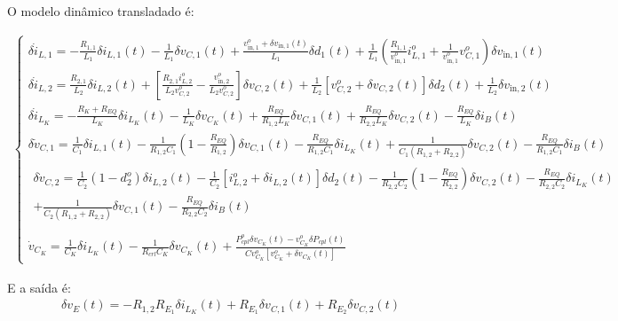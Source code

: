 O modelo dinâmico transladado é:

\begin{gather}
  \begin{cases}
    \delta \dot{i}_{L,1} = - \frac{R_{1,1}}{L_1} \delta i_{L,1}(t) - \frac{1}{L_1} \delta v_{C,1}(t) 
    + \frac{v_{\text{in}, 1}^o + \delta v_{\text{in}, 1}(t)}{L_1} \delta d_1(t) + 
    \frac{1}{L_1} \left(\frac{R_{1,1}}{v_{\text{in}, 1}^o} i_{L,1}^o + \frac{1}{v_{\text{in}, 1}^o} v_{C,1}^o\right) \delta v_{\text{in}, 1}(t) \\[12pt]
  \delta \dot{i}_{L,2} = \frac{R_{2,1}}{L_2} \delta i_{L,2}(t)
  + \left[\frac{R_{2,1} i_{L,2}^o}{L_2 v_{C,2}^o} - \frac{v_{\text{in},2}^o}{L_2 v_{C,2}^o}\right] \delta v_{C,2}(t) + \frac{1}{L_2} \left[v_{C,2}^o + \delta v_{C,2}(t)\right] \delta d_2(t) + \frac{1}{L_2} \delta v_{\text{in},2}(t) \\[12pt]
  \delta \dot{i}_{L_K} = - \frac{R_K + R_{EQ}}{L_K} \delta i_{L_K}(t)
  - \frac{1}{L_K} \delta v_{C_K}(t)
  + \frac{R_{EQ}}{{R_{1,2}}L_K} \delta v_{C,1}(t)
  + \frac{R_{EQ}}{R_{2,2}L_K} \delta v_{C,2}(t)
  - \frac{R_{EQ}}{L_K} \delta i_B(t) \\[12pt]
  \delta \dot v_{C,1} = \frac{1}{C_1} \delta i_{L,1}(t)
  - \frac{1}{R_{1,2}C_1} \left(1 - \frac{R_{EQ}}{{R_{1,2}}}\right) \delta v_{C,1}(t)
  - \frac{R_{EQ}}{R_{1,2} C_1} \delta i_{L_K}(t)
  + \frac{1}{C_1 (R_{1,2} + R_{2,2})} \delta v_{C,2}(t)
  - \frac{R_{EQ}}{R_{1,2} C_1} \delta i_B(t) \\[12pt]
  \begin{aligned}
    \delta \dot v_{C,2} = \frac{1}{C_2} (1 - d_2^o) \delta i_{L,2}(t) - \frac{1}{C_2} \left[i_{L,2}^o + \delta i_{L,2}(t)\right] \delta d_2(t)
    - \frac{1}{R_{2,2}C_2} \left(1 - \frac{R_{EQ}}{R_{2,2}}\right) \delta v_{C,2}(t)  
    - \frac{R_{EQ}}{R_{2,2} C_2} \delta i_{L_K}(t) \\+ \frac{1}{C_2(R_{1,2} + R_{2,2})}  \delta v_{C,1}(t) - \frac{R_{EQ}}{R_{2,2} C_2} \delta i_B(t) \\[12pt]
  \end{aligned} \\
  \dot{v}_{C_K} = \frac{1}{C_K} \delta i_{L_K}(t)
  - \frac{1}{R_{crl} C_K} \delta v_{C_K}(t)
  + \frac{P_{cpl}^o \delta v_{C_K}(t) - v_{C_K}^o \delta P_{cpl}(t)}{Cv_{C_K}^o\left[v_{C_K}^o + \delta v_{C_K}(t)\right]}  
\end{cases}
\end{gather}

E a saída é:
\begin{gather}
  \delta v_E(t) = - R_{1,2} R_{E_1} \delta i_{L_K}(t) + R_{E_1} \delta v_{C,1}(t) + R_{E_2} \delta v_{C,2}(t)
\end{gather}
